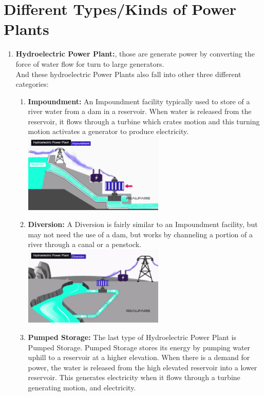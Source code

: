 \documentclass[11 pt]{article}
\begin{document}
\section{Different Types/Kinds of Power Plants}
\begin{enumerate}
	\item \textbf{Hydroelectric Power Plant:}, those are generate power by converting the force of water flow for turn to large generators.\\
And these hydroelectric Power Plants also fall into other three different categories:
		\begin{enumerate}
			\item \textbf{Impoundment:} An Impoundment facility typically used to store of a river water from a dam in a reservoir. When water is released from the reservoir, it flows through a turbine which crates motion and this turning motion activates a generator to produce electricity.\\
			\includegraphics[width=190pt]{Gallery/Impoundment-Power-Plants.png}
			\item \textbf{Diversion:} A Diversion is fairly similar to an Impoundment facility, but may not need the use of a dam, but works by channeling a portion of a river through a canal or a penstock.\\
			\includegraphics[width=190pt]{Gallery/Diversion-Power-Plants.png} 
			\item \textbf{Pumped Storage:} The last type of Hydroelectric Power Plant is Pumped Storage. Pumped Storage stores its energy by pumping water uphill to a reservoir at a higher elevation. When there is a demand for power, the water is released from the high elevated reservoir into a lower reservoir. This generates electricity when it flows through a turbine generating motion, and electricity.\\
		\end{enumerate}
		

\end{enumerate}
\end{document}
